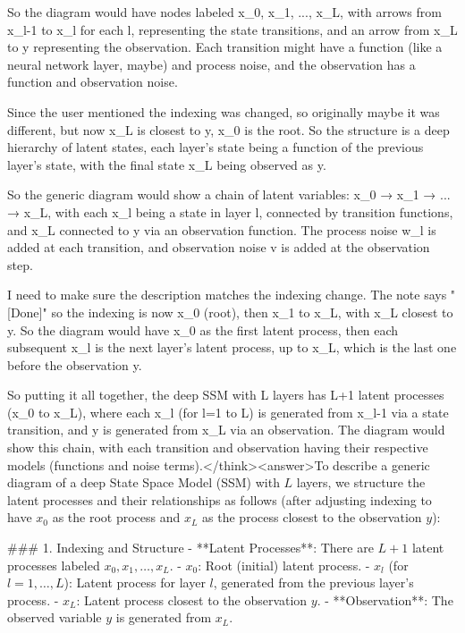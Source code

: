 So the diagram would have nodes labeled x_0, x_1, ..., x_L, with arrows from x_{l-1} to x_l for each l, representing the state transitions, and an arrow from x_L to y representing the observation. Each transition might have a function (like a neural network layer, maybe) and process noise, and the observation has a function and observation noise.

Since the user mentioned the indexing was changed, so originally maybe it was different, but now x_L is closest to y, x_0 is the root. So the structure is a deep hierarchy of latent states, each layer's state being a function of the previous layer's state, with the final state x_L being observed as y.

So the generic diagram would show a chain of latent variables: x_0 → x_1 → ... → x_L, with each x_l being a state in layer l, connected by transition functions, and x_L connected to y via an observation function. The process noise w_l is added at each transition, and observation noise v is added at the observation step.

I need to make sure the description matches the indexing change. The note says "[Done]" so the indexing is now x_0 (root), then x_1 to x_L, with x_L closest to y. So the diagram would have x_0 as the first latent process, then each subsequent x_l is the next layer's latent process, up to x_L, which is the last one before the observation y.

So putting it all together, the deep SSM with L layers has L+1 latent processes (x_0 to x_L), where each x_l (for l=1 to L) is generated from x_{l-1} via a state transition, and y is generated from x_L via an observation. The diagram would show this chain, with each transition and observation having their respective models (functions and noise terms).</think><answer>To describe a generic diagram of a deep State Space Model (SSM) with \( L \) layers, we structure the latent processes and their relationships as follows (after adjusting indexing to have \( x_0 \) as the root process and \( x_L \) as the process closest to the observation \( y \)):  


### 1. Indexing and Structure  
- **Latent Processes**: There are \( L+1 \) latent processes labeled \( x_0, x_1, \dots, x_L \).  
  - \( x_0 \): Root (initial) latent process.  
  - \( x_l \) (for \( l = 1, \dots, L \)): Latent process for layer \( l \), generated from the previous layer’s process.  
  - \( x_L \): Latent process closest to the observation \( y \).  
- **Observation**: The observed variable \( y \) is generated from \( x_L \).  



